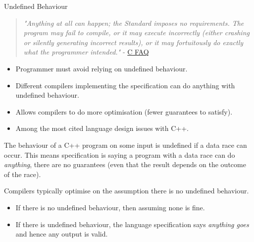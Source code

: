 \begin{definitionbox}{Undefined Behaviour}
  \begin{quote}
    \textit{"Anything at all can happen; the Standard imposes no requirements. The program 
    may fail to compile, or it may execute incorrectly (either crashing or silently 
    generating incorrect results), or it may fortuitously do exactly what the programmer 
    intended."} - \href{https://c-faq.com/ansi/undef.html}{C FAQ}
  \end{quote}
  \begin{itemize}
    \item Programmer must avoid relying on undefined behaviour.
    \item Different compilers implementing the specification can do anything with undefined behaviour.
    \item Allows compilers to do more optimisation (fewer guarantees to satisfy).
    \item Among the most cited language design issues with C++.
  \end{itemize}
  The behaviour of a C++ program on some input is undefined if a data race can occur. This means
  specification is saying a program with a data race can do \textit{anything}, there are no guarantees (even that the result depends on the outcome of the race).
\end{definitionbox}

Compilers typically optimise on the assumption there is no undefined behaviour. 
\begin{itemize}
  \item If there is no undefined behaviour, then assuming none is fine.
  \item If there is undefined behaviour, the language specification says \textit{anything goes} and hence any output is valid.
\end{itemize}

